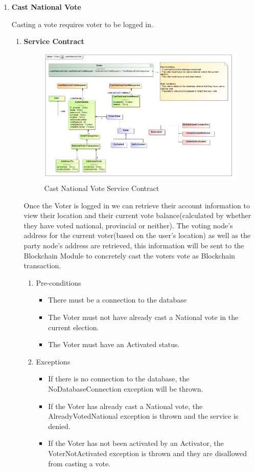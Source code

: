 \begin{enumerate}
\newpage

	\item \textbf{Cast National Vote}
	
	Casting a vote requires voter to be logged in.
	
	\begin{enumerate}
		\item \textbf{Service Contract}
		\begin{figure}[H]
			\centering
			\includegraphics[width=0.75\linewidth]{../Images/Voter/ServiceContracts/castNationalVote_serviceContract.png}
			\caption{Cast National Vote Service Contract}
		\end{figure}
		
		Once the Voter is logged in we can retrieve their account information to view their location and their current vote balance(calculated by whether they have voted national, provincial or neither). \newline
	 The voting node’s address for the current voter(based on the user’s location) as well as the party node’s address are retrieved, this information will be sent to the Blockchain Module to concretely cast the voters vote as Blockchain transaction.
		\newline				
		
		\begin{enumerate}
			\item Pre-conditions
			\begin{itemize}
				\item There must be a connection to the database
				\item The Voter must not have already cast a National vote in the current election. 
				\item The Voter must have an Activated status.  
			\end{itemize}
			
			\item Exceptions
			\begin{itemize}
				\item If there is no connection to the database, the NoDatabaseConnection exception will be thrown.
				\item If the Voter has already cast a National vote, the AlreadyVotedNational exception is thrown and the service is denied.
				\item If the Voter has not been activated by an Activator, the VoterNotActivated exception is thrown and they are disallowed from casting a vote. 
			\end{itemize}
			

\end{enumerate}
\end{enumerate}
\end{enumerate}
